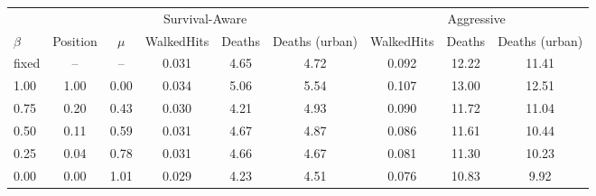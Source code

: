 \begin{tabular}{lcccccccc}
\toprule
 & \multicolumn{5}{c}{Survival-Aware} & \multicolumn{3}{c}{Aggressive} \\
\cmidrule(lr){2-6}\cmidrule(lr){7-9}
$\beta$ & Position & $\mu$ & WalkedHits & Deaths & Deaths (urban) & WalkedHits & Deaths & Deaths (urban) \\
\midrule
fixed & -- & -- & 0.031 & 4.65 & 4.72 & 0.092 & 12.22 & 11.41 \\
1.00 & 1.00 & 0.00 & 0.034 & 5.06 & 5.54 & 0.107 & 13.00 & 12.51 \\
0.75 & 0.20 & 0.43 & 0.030 & 4.21 & 4.93 & 0.090 & 11.72 & 11.04 \\
0.50 & 0.11 & 0.59 & 0.031 & 4.67 & 4.87 & 0.086 & 11.61 & 10.44 \\
0.25 & 0.04 & 0.78 & 0.031 & 4.66 & 4.67 & 0.081 & 11.30 & 10.23 \\
0.00 & 0.00 & 1.01 & 0.029 & 4.23 & 4.51 & 0.076 & 10.83 & 9.92 \\
\bottomrule
\end{tabular}
